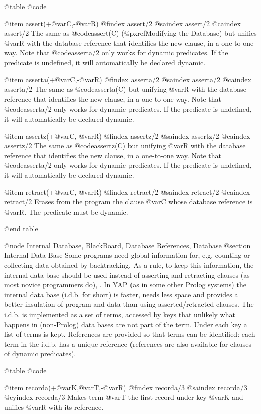 {{{{{{@table @code

@item assert(+@var{C},-@var{R})
@findex assert/2
@saindex assert/2
@caindex assert/2
 The same as @code{assert(C)} (@pxref{Modifying the Database}) but
unifies @var{R} with the  database reference that identifies the new
clause, in a one-to-one way. Note that @code{asserta/2} only works for dynamic
predicates. If the predicate is undefined, it will automatically be
declared dynamic.

@item asserta(+@var{C},-@var{R})
@findex asserta/2
@saindex asserta/2
@caindex asserta/2
 The same as @code{asserta(C)} but unifying @var{R} with
the  database reference that identifies the new clause, in a 
one-to-one way. Note that @code{asserta/2} only works for dynamic
predicates. If the predicate is undefined, it will automatically be
declared dynamic.

@item assertz(+@var{C},-@var{R})
@findex assertz/2
@saindex assertz/2
@caindex assertz/2
 The same as @code{assertz(C)} but unifying @var{R} with
the  database reference that identifies the new clause, in a 
one-to-one way. Note that @code{asserta/2} only works for dynamic
predicates. If the predicate is undefined, it will automatically be
declared dynamic.

@item retract(+@var{C},-@var{R})
@findex retract/2
@saindex retract/2
@caindex retract/2
 Erases from the program the clause @var{C} whose 
database reference is @var{R}. The predicate must be dynamic.


@end table

@node Internal Database, BlackBoard, Database References, Database
@section Internal Data Base
Some programs need global information for, e.g. counting or collecting 
data obtained by backtracking. As a rule, to keep this information, the
internal data base should be used instead of asserting and retracting
clauses (as most novice programmers  do), .
In YAP (as in some other Prolog systems) the internal data base (i.d.b. 
for short) is faster, needs less space and provides a better insulation of 
program and data than using asserted/retracted clauses.
The i.d.b. is implemented as a set of terms, accessed by keys that 
unlikely what happens in (non-Prolog) data bases are not part of the 
term. Under each key a list of terms is kept. References are provided so that 
terms can be identified: each term in the i.d.b. has a unique reference 
(references are also available for clauses of dynamic predicates).

@table @code

@item recorda(+@var{K},@var{T},-@var{R})
@findex recorda/3
@saindex recorda/3
@cyindex recorda/3
Makes term @var{T} the first record under key @var{K} and  unifies @var{R}
with its reference.

}}}}}}

